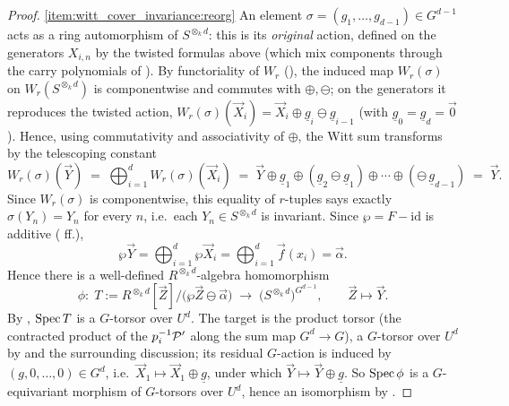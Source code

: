 \begin{proof}
    \ref{item:witt_cover_invariance:reorg} An element
    $\sigma = (g_1, \dots, g_{d-1}) \in G^{d-1}$ acts as a ring automorphism of
    $S^{\otimes_k d}$: this is its \emph{original} action, defined on the generators
    $X_{i,n}$ by the twisted formulas above (which mix components through the carry
    polynomials of ). By functoriality of $W_r$
    (), the induced map $W_r(\sigma)$ on
    $W_r(S^{\otimes_k d})$ is componentwise and commutes with $\oplus, \ominus$; on
    the generators it reproduces the twisted action,
    $W_r(\sigma)(\vec X_i) = \vec X_i \oplus \underline g_i \ominus \underline g_{i-1}$
    (with $\underline g_0 = \underline g_d = \vec 0$). Hence, using commutativity and
    associativity of $\oplus$, the Witt sum transforms by the telescoping constant
    \[
    W_r(\sigma)(\vec Y)
    \;=\; \bigoplus_{i=1}^{d} W_r(\sigma)(\vec X_i)
    \;=\; \vec Y \oplus \underline g_1 \oplus (\underline g_2 \ominus \underline g_1)
    \oplus \cdots \oplus (\ominus\, \underline g_{d-1})
    \;=\; \vec Y.
    \]
    Since $W_r(\sigma)$ is componentwise, this equality of $r$-tuples says exactly
    $\sigma(Y_n) = Y_n$ for every $n$, i.e.\ each $Y_n \in S^{\otimes_k d}$ is
    invariant. Since $\wp = F - \mathrm{id}$ is additive
    ( ff.),
    \[
    \wp \vec Y = \bigoplus_{i=1}^{d} \wp \vec X_i
    = \bigoplus_{i=1}^{d} \vec f(x_i) = \vec \alpha .
    \]
    Hence there is a well-defined $R^{\otimes_k d}$-algebra homomorphism
    \[
    \phi \colon\; T := R^{\otimes_k d}[\vec Z]\big/\bigl(\wp \vec Z \ominus \vec \alpha\bigr)
    \;\longrightarrow\; \bigl(S^{\otimes_k d}\bigr)^{G^{d-1}},
    \qquad \vec Z \mapsto \vec Y .
    \]
    By , $\operatorname{Spec} T$ is a $G$-torsor over $U^d$. The
    target is the product torsor (the contracted product of the $p_i^{-1}\mathcal{P}'$ along
    the sum map $G^d \to G$), a $G$-torsor over $U^d$ by
     and the surrounding discussion; its residual
    $G$-action is induced by $(g, 0, \dots, 0) \in G^d$, i.e.\
    $\vec X_1 \mapsto \vec X_1 \oplus \underline g$, under which
    $\vec Y \mapsto \vec Y \oplus \underline g$. So $\operatorname{Spec} \phi$ is a $G$-equivariant
    morphism of $G$-torsors over $U^d$, hence an isomorphism by
    .


\end{proof}
